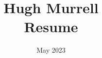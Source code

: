 \documentclass[12pt]{article}
\title{
           Hugh Murrell \\
           Resume \\
       }
\date{May 2023}
\begin{document}
\maketitle


%

\small
\end{document}
